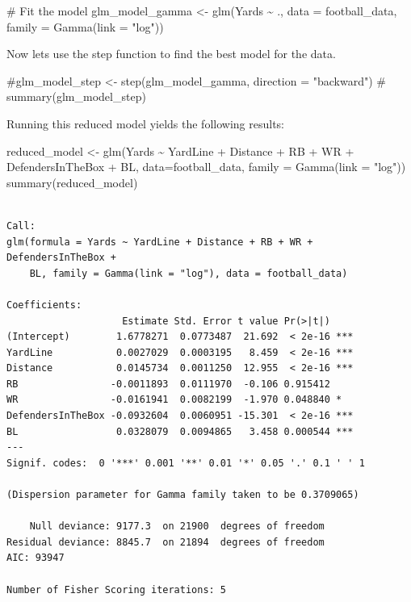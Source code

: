 \documentclass[
  super,
  preprint,
  3p]{elsarticle}
\newenvironment{Shaded}{\begin{snugshade}}{\end{snugshade}}
\newcommand{\AttributeTok}[1]{\textcolor[rgb]{0.40,0.45,0.13}{#1}}
\newcommand{\CommentTok}[1]{\textcolor[rgb]{0.37,0.37,0.37}{#1}}
\newcommand{\FunctionTok}[1]{\textcolor[rgb]{0.28,0.35,0.67}{#1}}
\newcommand{\NormalTok}[1]{\textcolor[rgb]{0.00,0.23,0.31}{#1}}
\newcommand{\OtherTok}[1]{\textcolor[rgb]{0.00,0.23,0.31}{#1}}
\newcommand{\SpecialCharTok}[1]{\textcolor[rgb]{0.37,0.37,0.37}{#1}}
\newcommand{\StringTok}[1]{\textcolor[rgb]{0.13,0.47,0.30}{#1}}
\begin{document}
\begin{Shaded}
\begin{Highlighting}[]
\CommentTok{\# Fit the model}
\NormalTok{glm\_model\_gamma }\OtherTok{\textless{}{-}} \FunctionTok{glm}\NormalTok{(Yards }\SpecialCharTok{\textasciitilde{}}\NormalTok{ ., }\AttributeTok{data =}\NormalTok{ football\_data, }\AttributeTok{family =} \FunctionTok{Gamma}\NormalTok{(}\AttributeTok{link =} \StringTok{"log"}\NormalTok{))}
\end{Highlighting}
\end{Shaded}

Now lets use the step function to find the best model for the data.

\begin{Shaded}
\begin{Highlighting}[]
\CommentTok{\#glm\_model\_step \textless{}{-} step(glm\_model\_gamma, direction = "backward")}
\CommentTok{\# summary(glm\_model\_step)}
\end{Highlighting}
\end{Shaded}

Running this reduced model yields the following results:

\begin{Shaded}
\begin{Highlighting}[]
\NormalTok{reduced\_model }\OtherTok{\textless{}{-}} \FunctionTok{glm}\NormalTok{(Yards }\SpecialCharTok{\textasciitilde{}}\NormalTok{ YardLine }\SpecialCharTok{+}\NormalTok{ Distance }\SpecialCharTok{+}\NormalTok{ RB }\SpecialCharTok{+}\NormalTok{ WR }\SpecialCharTok{+}\NormalTok{ DefendersInTheBox }\SpecialCharTok{+}\NormalTok{ BL, }\AttributeTok{data=}\NormalTok{football\_data, }\AttributeTok{family =} \FunctionTok{Gamma}\NormalTok{(}\AttributeTok{link =} \StringTok{"log"}\NormalTok{))}
\FunctionTok{summary}\NormalTok{(reduced\_model)}
\end{Highlighting}
\end{Shaded}

\begin{verbatim}

Call:
glm(formula = Yards ~ YardLine + Distance + RB + WR + DefendersInTheBox + 
    BL, family = Gamma(link = "log"), data = football_data)

Coefficients:
                    Estimate Std. Error t value Pr(>|t|)    
(Intercept)        1.6778271  0.0773487  21.692  < 2e-16 ***
YardLine           0.0027029  0.0003195   8.459  < 2e-16 ***
Distance           0.0145734  0.0011250  12.955  < 2e-16 ***
RB                -0.0011893  0.0111970  -0.106 0.915412    
WR                -0.0161941  0.0082199  -1.970 0.048840 *  
DefendersInTheBox -0.0932604  0.0060951 -15.301  < 2e-16 ***
BL                 0.0328079  0.0094865   3.458 0.000544 ***
---
Signif. codes:  0 '***' 0.001 '**' 0.01 '*' 0.05 '.' 0.1 ' ' 1

(Dispersion parameter for Gamma family taken to be 0.3709065)

    Null deviance: 9177.3  on 21900  degrees of freedom
Residual deviance: 8845.7  on 21894  degrees of freedom
AIC: 93947

Number of Fisher Scoring iterations: 5
\end{verbatim}
\end{document}
